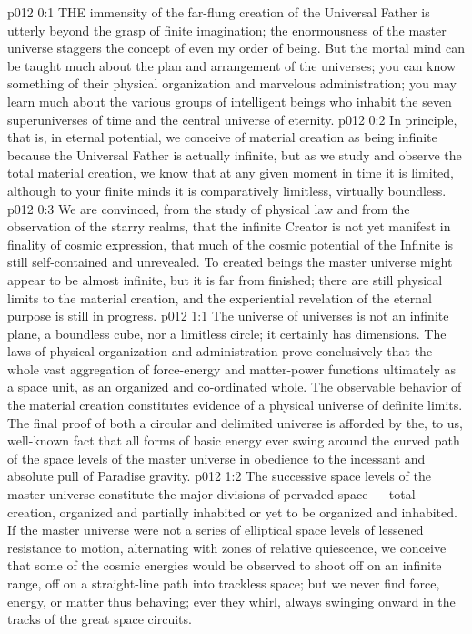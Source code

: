 \vs p012 0:1 THE immensity of the far\hyp{}flung creation of the Universal Father is utterly beyond the grasp of finite imagination; the enormousness of the master universe staggers the concept of even my order of being. But the mortal mind can be taught much about the plan and arrangement of the universes; you can know something of their physical organization and marvelous administration; you may learn much about the various groups of intelligent beings who inhabit the seven superuniverses of time and the central universe of eternity.
\vs p012 0:2 In principle, that is, in eternal potential, we conceive of material creation as being infinite because the Universal Father is actually infinite, but as we study and observe the total material creation, we know that at any given moment in time it is limited, although to your finite minds it is comparatively limitless, virtually boundless.
\vs p012 0:3 We are convinced, from the study of physical law and from the observation of the starry realms, that the infinite Creator is not yet manifest in finality of cosmic expression, that much of the cosmic potential of the Infinite is still self\hyp{}contained and unrevealed. To created beings the master universe might appear to be almost infinite, but it is far from finished; there are still physical limits to the material creation, and the experiential revelation of the eternal purpose is still in progress.
\vs p012 1:1 The universe of universes is not an infinite plane, a boundless cube, nor a limitless circle; it certainly has dimensions. The laws of physical organization and administration prove conclusively that the whole vast aggregation of force\hyp{}energy and matter\hyp{}power functions ultimately as a space unit, as an organized and co\hyp{}ordinated whole. The observable behavior of the material creation constitutes evidence of a physical universe of definite limits. The final proof of both a circular and delimited universe is afforded by the, to us, well\hyp{}known fact that all forms of basic energy ever swing around the curved path of the space levels of the master universe in obedience to the incessant and absolute pull of Paradise gravity.
\vs p012 1:2 The successive space levels of the master universe constitute the major divisions of pervaded space --- total creation, organized and partially inhabited or yet to be organized and inhabited. If the master universe were not a series of elliptical space levels of lessened resistance to motion, alternating with zones of relative quiescence, we conceive that some of the cosmic energies would be observed to shoot off on an infinite range, off on a straight\hyp{}line path into trackless space; but we never find force, energy, or matter thus behaving; ever they whirl, always swinging onward in the tracks of the great space circuits.
